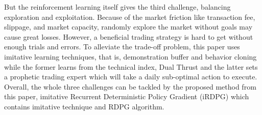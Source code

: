 \begin{itemize}
But the reinforcement learning itself gives the third challenge, balancing exploration and exploitation. Because of the market friction like transaction fee, slippage, and market capacity, randomly explore the market without goals may cause great losses. However, a beneficial trading strategy is hard to get without enough trials and errors. To alleviate the trade-off problem, this paper uses imitative learning techniques, that is,  demonstration buffer and behavior cloning while the former learns from the technical index, Dual Thrust and the latter sets a prophetic trading expert which will take a daily sub-optimal action to execute. Overall, the whole three challenges can be tackled by the proposed method from this paper, imitative Recurrent Deterministic Policy Gradient (iRDPG) which contains imitative technique and RDPG algorithm. 
\end{itemize}
